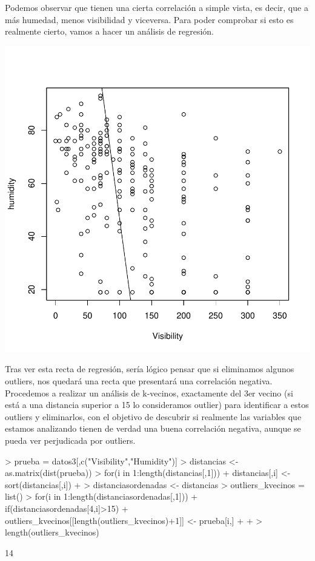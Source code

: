 \documentclass [a4paper] {article}
\begin{document}
Podemos observar que tienen una cierta correlación a simple vista, es decir, que a más humedad, menos visibilidad y viceversa. Para poder comprobar si esto es 
realmente cierto, vamos a hacer un análisis de regresión.

\begin{center}
\includegraphics{entrega-datvishumplotregres}
\end{center}

Tras ver esta recta de regresión, sería lógico pensar que si eliminamos algunos outliers, nos quedará una recta que presentará una correlación negativa.
 Procedemos a realizar un análisis de k-vecinos, exactamente del 3er vecino (si está a una distancia superior a 15 lo consideramos outlier) para identificar 
 a estos outliers y eliminarlos, con el objetivo de descubrir si realmente las variables que estamos 
 analizando tienen de verdad una buena correlación negativa, aunque se pueda ver perjudicada por outliers.

\begin{Schunk}
\begin{Sinput}
> prueba = datos3[,c("Visibility","Humidity")]
> distancias <- as.matrix(dist(prueba))
> for(i in 1:length(distancias[,1])){
+ distancias[,i] <- sort(distancias[,i])
+ }
> distanciasordenadas <- distancias
> outliers_kvecinos = list()
> for(i in 1:length(distanciasordenadas[,1])){
+     if(distanciasordenadas[4,i]>15){
+         outliers_kvecinos[[length(outliers_kvecinos)+1]] <- prueba[i,]
+     }
+ }
> length(outliers_kvecinos)
\end{Sinput}
\begin{Soutput}
[1] 14
\end{Soutput}
\end{Schunk}
\end{document}
